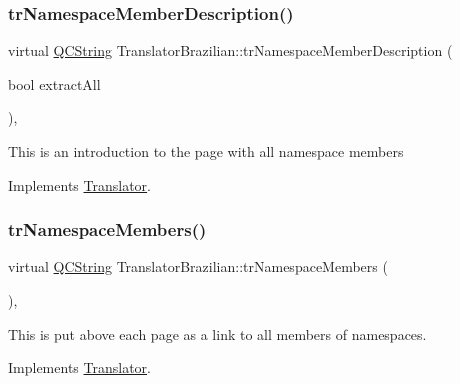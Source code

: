 \mbox{\label{class_translator_brazilian_ad907a5efc902bb1292afb4317ea6eb77}} 
\subsubsection{\texorpdfstring{trNamespaceMemberDescription()}{trNamespaceMemberDescription()}}
{\footnotesize\ttfamily virtual \mbox{\hyperlink{class_q_c_string}{Q\+C\+String}} Translator\+Brazilian\+::tr\+Namespace\+Member\+Description (\begin{DoxyParamCaption}\item[{bool}]{extract\+All }\end{DoxyParamCaption})\hspace{0.3cm}{\ttfamily [inline]}, {\ttfamily [virtual]}}

This is an introduction to the page with all namespace members 

Implements \mbox{\hyperlink{class_translator}{Translator}}.

\mbox{\label{class_translator_brazilian_a18cd0bfe03a7af67b005866018ea3e84}} 
\subsubsection{\texorpdfstring{trNamespaceMembers()}{trNamespaceMembers()}}
{\footnotesize\ttfamily virtual \mbox{\hyperlink{class_q_c_string}{Q\+C\+String}} Translator\+Brazilian\+::tr\+Namespace\+Members (\begin{DoxyParamCaption}{ }\end{DoxyParamCaption})\hspace{0.3cm}{\ttfamily [inline]}, {\ttfamily [virtual]}}

This is put above each page as a link to all members of namespaces. 

Implements \mbox{\hyperlink{class_translator}{Translator}}.

\mbox{\label{class_translator_brazilian_ae78d3ec8e7d854165b325e63744b822b}} 
